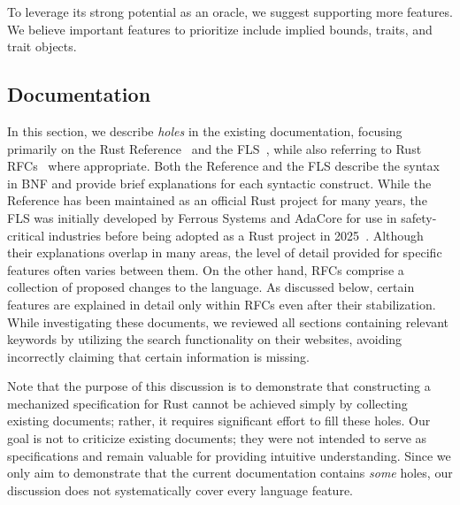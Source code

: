 To leverage its strong potential as an oracle, we suggest supporting more
features.
%
We believe important features to prioritize include implied bounds, 
traits, and trait objects.

\subsection{Documentation}

In this section, we describe \emph{holes} in the existing documentation,
focusing primarily on the Rust Reference~\cite{rust-reference} and the
FLS~\cite{fls}, while also referring to Rust RFCs~\cite{rust-rfcs} where
appropriate.
%
Both the Reference and the FLS describe the syntax in BNF and provide brief
explanations for each syntactic construct.
%
While the Reference has been maintained as an official Rust project for many
years, the FLS was initially developed by Ferrous Systems and AdaCore for use in
safety-critical industries before being adopted as a Rust project in
2025~\cite{adopting-fls}.
%
Although their explanations overlap in many areas, the level of detail provided
for specific features often varies between them.
%
On the other hand, RFCs comprise a collection of proposed changes to the
language.
%
As discussed below, certain features are explained in detail only within RFCs
even after their stabilization.
%
While investigating these documents, we reviewed all sections containing
relevant keywords by utilizing the search functionality on their websites,
avoiding incorrectly claiming that certain information is missing.

Note that the purpose of this discussion is to demonstrate that constructing a
mechanized specification for Rust cannot be achieved simply by collecting
existing documents;
%
rather, it requires significant effort to fill these holes.
%
Our goal is not to criticize existing documents;
%
they were not intended to serve as specifications and remain valuable for
providing intuitive understanding.
%
Since we only aim to demonstrate that the current documentation contains
\emph{some} holes, our discussion does not systematically cover every language
feature.

%

